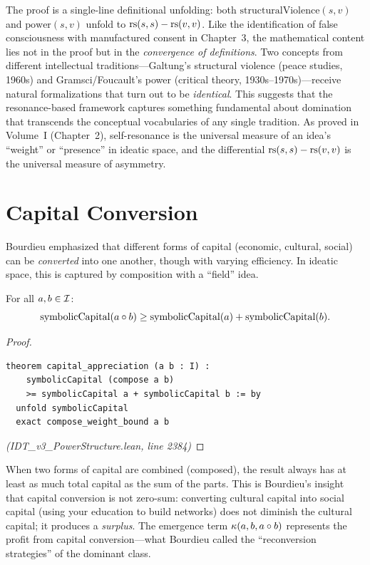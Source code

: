 \begin{remark}
The proof is a single-line definitional unfolding: both
$\mathrm{structuralViolence}(s,v)$ and $\mathrm{power}(s,v)$ unfold to
$\mathrm{rs}(s,s) - \mathrm{rs}(v,v)$. Like the identification of false consciousness with
manufactured consent in Chapter~3, the mathematical content lies not in the
proof but in the \emph{convergence of definitions}. Two concepts from different
intellectual traditions---Galtung's structural violence (peace studies, 1960s)
and Gramsci/Foucault's power (critical theory, 1930s--1970s)---receive natural
formalizations that turn out to be \emph{identical}. This suggests that the
resonance-based framework captures something fundamental about domination that
transcends the conceptual vocabularies of any single tradition. As proved in
Volume~I (Chapter~2), self-resonance is the universal measure of an idea's
``weight'' or ``presence'' in ideatic space, and the differential
$\mathrm{rs}(s,s) - \mathrm{rs}(v,v)$ is the universal measure of asymmetry.
\end{remark}

\section{Capital Conversion}

Bourdieu emphasized that different forms of capital (economic, cultural, social)
can be \emph{converted} into one another, though with varying efficiency. In
ideatic space, this is captured by composition with a ``field'' idea.

\begin{theorem}
\label{thm:capital-appreciation}
For all $a, b \in \mathcal{I}$:
\[
  \mathrm{symbolicCapital}(a \circ b) \geq \mathrm{symbolicCapital}(a) + \mathrm{symbolicCapital}(b).
\]
\end{theorem}

\begin{proof}
\begin{lstlisting}
theorem capital_appreciation (a b : I) :
    symbolicCapital (compose a b)
    >= symbolicCapital a + symbolicCapital b := by
  unfold symbolicCapital
  exact compose_weight_bound a b
\end{lstlisting}
\textit{(IDT\_v3\_PowerStructure.lean, line 2384)}
\end{proof}

\begin{interpretation}
When two forms of capital are combined (composed), the result always has at least
as much total capital as the sum of the parts. This is Bourdieu's insight that
capital conversion is not zero-sum: converting cultural capital into social
capital (using your education to build networks) does not diminish the cultural
capital; it produces a \emph{surplus}. The emergence term $\kappa(a,b,a \circ b)$
represents the profit from capital conversion---what Bourdieu called the
``reconversion strategies'' of the dominant class.
\end{interpretation}

